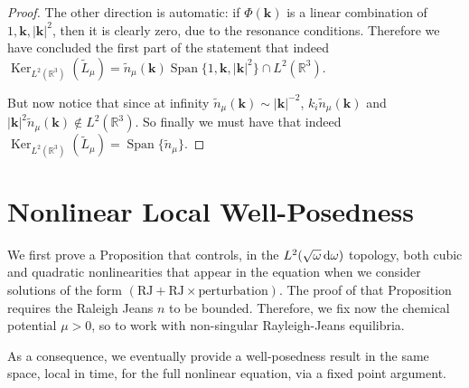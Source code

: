 \documentclass[reqno,11pt,letterpaper]{amsart}
\numberwithin{equation}{section}
\newcommand{\dd}{\, {\rm d}}
\begin{document}
\begin{proof}
The other direction is automatic: if $\Phi(\textbf{k})$ is a linear combination of $1, \textbf{k}, |\textbf{k}|^2$, then it is clearly zero, due to the resonance conditions.  
Therefore we have concluded the first part of the statement that indeed 
$ \operatorname{Ker}_{L^2(\mathbb{R}^3)}(\widetilde L_\mu) = \widetilde n_\mu (\textbf{k}) \operatorname{Span}\{1, \textbf{k}, |\textbf{k}|^2\} \cap L^2(\mathbb{R}^3).$ 

But now notice that since at infinity $\widetilde n_\mu(\textbf{k}) \sim |\textbf{k}|^{-2}$, $k_i \widetilde n_\mu(\textbf{k})$ and $|\textbf{k}|^2 \widetilde n_\mu(\textbf{k}) \notin L^2(\mathbb{R}^3)$. So finally we must have that indeed $\operatorname{Ker}_{L^2(\mathbb{R}^3)}(\widetilde L_\mu)=\operatorname{Span}\{\widetilde n_\mu\}$. 
\end{proof}




\section{Nonlinear Local Well-Posedness}\label{sec:LWP}



We first prove a Proposition that controls, in the $L^2(\sqrt{\omega} \dd \omega)$ topology, both cubic and quadratic nonlinearities that appear in the equation when we consider solutions of the form $(\text{RJ} +\text{RJ}\times \text{perturbation})$.  The proof of that Proposition requires the Raleigh Jeans $n$ to be bounded. Therefore, we fix now the chemical potential $\mu>0$, so to work with non-singular Rayleigh-Jeans equilibria.  

As a consequence, we eventually provide a well-posedness result in the same space, local in time, for the full nonlinear equation, via a fixed point argument.
\end{document}
